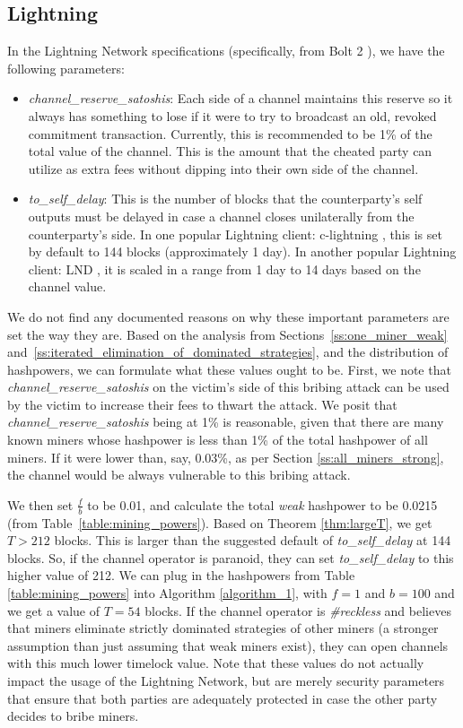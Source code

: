 \documentclass[runningheads]{llncs}
\begin{document}
\subsection{Lightning}
In the Lightning Network specifications (specifically, from Bolt 2 \cite{bolt_2}), we have the following parameters:
\begin{itemize}
    \item \emph{channel\_reserve\_satoshis}: Each side of a channel maintains this reserve so it always has something to lose if it were to try to broadcast an old, revoked commitment transaction. Currently, this is recommended to be 1\% of the total value of the channel. This is the amount that the cheated party can utilize as extra fees without dipping into their own side of the channel. 
    \item \emph{to\_self\_delay}: This is the number of blocks that the counterparty's self outputs must be delayed in case a channel closes unilaterally from the counterparty's side. In one popular Lightning client: c-lightning \cite{c_lightning}, this is set by default to 144 blocks (approximately 1 day). In another popular Lightning client: LND \cite{lnd}, it is scaled in a range from 1 day to 14 days based on the channel value. 
\end{itemize}
We do not find any documented reasons on why these important parameters are set the way they are. Based on the analysis from Sections~\ref{ss:one_miner_weak} and~\ref{ss:iterated_elimination_of_dominated_strategies}, and the distribution of hashpowers, we can formulate what these values ought to be. 
First, we note that \emph{channel\_reserve\_satoshis} on the victim's side of this bribing attack can be used by the victim to increase their fees to thwart the attack. We posit that \emph{channel\_reserve\_satoshis} being at 1\% is reasonable, given that there are many known miners whose hashpower is less than 1\% of the total hashpower of all miners. If it were lower than, say, 0.03\%, as per Section \ref{ss:all_miners_strong}, the channel would be always vulnerable to this bribing attack.     

We then set $\frac{f}{b}$ to be 0.01, and calculate the total \emph{weak} hashpower to be 0.0215 (from Table~\ref{table:mining_powers}). Based on Theorem \ref{thm:largeT}, we get $T > 212$ blocks. This is larger than the suggested default of \emph{to\_self\_delay} at 144 blocks. So, if the channel operator is paranoid, they can set \emph{to\_self\_delay} to this higher value of 212. We can plug in the hashpowers from Table \ref{table:mining_powers} into Algorithm \ref{algorithm_1}, with $f = 1$ and $b = 100$ and we get a value of $T = 54$ blocks. If the channel operator is \emph{\#reckless} and believes that miners eliminate strictly dominated strategies of other miners (a stronger assumption than just assuming that weak miners exist), they can open channels with this much lower timelock value. Note that these values do not actually impact the usage of the Lightning Network, but are merely security parameters that ensure that both parties are adequately protected in case the other party decides to bribe miners. 
\end{document}
